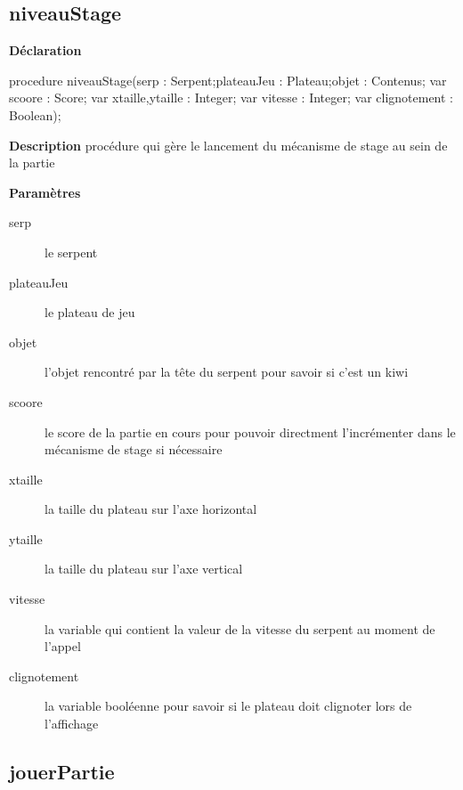 \documentclass{report}
\newif\ifpdf
\begin{document}
\subsection*{niveauStage}
\fi
\label{Jouer-niveauStage}
\begin{list}{}{
\setlength{\itemindent}{0cm}
\setlength{\listparindent}{0cm}
\setlength{\leftmargin}{\evensidemargin}
\addtolength{\leftmargin}{\tmplength}
\settowidth{\labelsep}{X}
\addtolength{\leftmargin}{\labelsep}
\setlength{\labelwidth}{\tmplength}
}
\item[\textbf{Déclaration}\hfill]
\ifpdf
\begin{flushleft}
\fi
\begin{ttfamily}
procedure niveauStage(serp : Serpent;plateauJeu : Plateau;objet : Contenus; var scoore : Score; var xtaille,ytaille : Integer; var vitesse : Integer; var clignotement : Boolean);\end{ttfamily}

\ifpdf
\end{flushleft}
\fi

\par
\item[\textbf{Description}]
procédure qui gère le lancement du mécanisme de stage au sein de la partie        \par
\item[\textbf{Paramètres}]
\begin{description}
\item[serp] le serpent
\item[plateauJeu] le plateau de jeu
\item[objet] l'objet rencontré par la tête du serpent pour savoir si c'est un kiwi
\item[scoore] le score de la partie en cours pour pouvoir directment l'incrémenter dans le mécanisme de stage si nécessaire
\item[xtaille] la taille du plateau sur l'axe horizontal
\item[ytaille] la taille du plateau sur l'axe vertical
\item[vitesse] la variable qui contient la valeur de la vitesse du serpent au moment de l'appel
\item[clignotement] la variable booléenne pour savoir si le plateau doit clignoter lors de l'affichage
\end{description}


\end{list}
\ifpdf
\subsection*{\large{\textbf{jouerPartie}}\normalsize\hspace{1ex}\hrulefill}
\else
\end{document}
